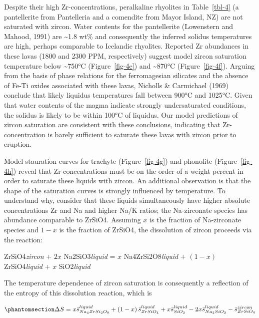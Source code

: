\documentclass[
]{agujournal2019}
\begin{document}
Despite their high Zr-concentrations, peralkaline rhyolites in
Table~\ref{tbl-4} (a pantellerite from Pantelleria and a comendite from
Mayor Island, NZ) are not saturated with zircon. Water contents for the
pantellerite (Lowenstern and Mahood, 1991) are \textasciitilde1.8 wt\%
and consequently the inferred solidus temperatures are high, perhaps
comparable to Icelandic rhyolites. Reported Zr abundances in these lavas
(1800 and 2300 PPM, respectively) suggest model zircon saturation
temperature below \textasciitilde750°C (Figure~\ref{fig-4e}) and
\textasciitilde870°C (Figure~\ref{fig-4f}). Arguing from the basis of
phase relations for the ferromagesian silicates and the absence of Fe-Ti
oxides associated with these lavas, Nicholls \& Carmichael (1969)
conclude that likely liquidus temperatures fall between 900°C and
1025°C. Given that water contents of the magma indicate strongly
undersaturated conditions, the solidus is likely to be within 100°C of
liquidus. Our model predictions of zircon saturation are consistent with
these conclusions, indicating that Zr-concentration is barely sufficient
to saturate these lavas with zircon prior to eruption.

Model stauration curves for trachyte (Figure~\ref{fig-4g}) and phonolite
(Figure~\ref{fig-4h}) reveal that Zr-concentrations must be on the order
of a weight percent in order to saturate these liquids with zircon. An
additional observation is that the shape of the saturation curves is
strongly influenced by temperature. To understand why, consider that
these liquids simultaneously have higher absolute concentrations Zr and
Na and higher Na/K ratios; the Na-zirconate species has abundance
comparable to ZrSiO4. Assuming \(x\) is the fraction of Na-zirconate
species and \(1-x\) is the fraction of ZrSiO4, the dissolution of zircon
proceeds via the reaction:

ZrSiO4\emph{zircon} + \(2 x\) Na2SiO3\emph{liquid} = \(x\)
Na4ZrSi2O8\emph{liquid} + \(\left( 1-x \right)\) ZrSiO4\emph{liquid} +
\(x\) SiO2\emph{liquid}

The temperature dependence of zircon saturation is consequently a
reflection of the entropy of this dissolution reaction, which is

\begin{equation}\phantomsection\label{eq-9}{
\Delta S = x \bar{s}_{Na_4ZrSi_2O_8}^{liquid} + \left( 1-x \right) \bar{s}_{ZrSiO_4}^{liquid} + x \bar{s}_{SiO_2}^{liquid} - 2 x \bar{s}_{Na_2SiO_3}^{liquid} - \bar{s}_{ZrSiO_4}^{zircon}
}\end{equation}
\end{document}
